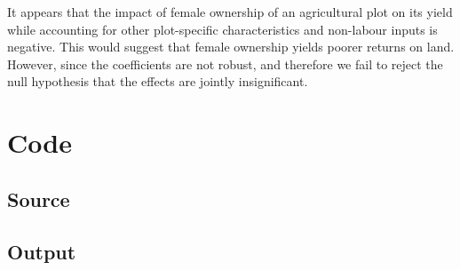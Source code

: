 \documentclass{article}
\begin{document}
It appears that the impact of female ownership of an agricultural plot on its yield while accounting for other plot-specific characteristics and non-labour inputs is negative. This would suggest that female ownership yields poorer returns on land. However, since the coefficients are not robust, and therefore we fail to reject the null hypothesis that the effects are jointly insignificant.

\newpage

\section{Code}

\subsection{Source}


\newpage

\subsection{Output}

\end{document}
